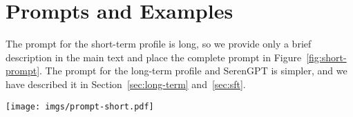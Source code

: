 \section{Prompts and Examples}\label{app:prompt}
The prompt for the short-term profile is long, so we provide only a brief description in the main text and place the complete prompt in Figure~\ref{fig:short-prompt}. The prompt for the long-term profile and SerenGPT is simpler, and we have described it in Section~\ref{sec:long-term} and~\ref{sec:sft}. 


\begin{figure*}  
    \centering
    \texttt{[image: imgs/prompt-short.pdf]}  
    \caption{Prompt for short-term profile.}
    \label{fig:short-prompt}
\end{figure*}



